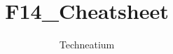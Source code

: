 \documentclass[fontSpartan]{TechCheck}
\title{F14_Cheatsheet}
\author{Techneatium}
\begin{document}
	

	\frontmatter
	\pagestyle{empty}
	\dominitoc
	\tableofcontents
	\cleardoublepage

	\setcounter{page}{1}
	\mainmatter
	\pagestyle{body}

	

	

	

	

	

	

	

\iftoggle{print}{
	\pagestyle{superempty}
	\newpage \null
	\thumbwide
	\newpage \null
}{}
\end{document}
